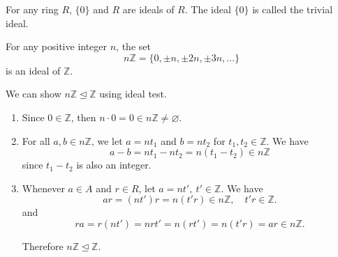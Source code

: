 \begin{example}
    For any ring $R$, $\{0 \}$ and $R$ are ideals of $R$. The ideal $\{ 0 \}$ is called the trivial ideal.
\end{example}

\begin{example}
    For any positive integer $n$, the set 
    \[
        n\mathbb{Z} = \{ 0, \pm n, \pm 2n, \pm 3n, \ldots \}
    \]
    is an ideal of $\mathbb{Z}$.
\end{example}
\begin{solution}
    We can show $n\mathbb{Z} \unlhd \mathbb{Z}$ using ideal test.
    \begin{enumerate}
        \item Since $0 \in \mathbb{Z}$, then $n \cdot 0 = 0 \in n\mathbb{Z} \neq \varnothing$.
        \item For all $a, b \in n\mathbb{Z}$, we let $a=nt_1$ and $b=nt_2$ for $t_1, t_2 \in \mathbb{Z}$. We have 
            \[
                a - b = nt_1 - nt_2 = n(t_1 - t_2) \in n\mathbb{Z} 
            \]
            since $t_1 - t_2$ is also an integer.
        
        \item Whenever $a \in A$ and $r \in R$, let $a = nt', \> t' \in \mathbb{Z}$. We have 
            \[
                ar = (nt')r = n(t'r) \in n\mathbb{Z}, \quad t'r \in \mathbb{Z}.
            \]
            and 
            \[
                ra = r(nt') = nrt' = n(rt') = n(t'r) = ar \in n\mathbb{Z}.
            \]
        
        Therefore $n\mathbb{Z} \unlhd \mathbb{Z}$.
    \end{enumerate}
\end{solution}

